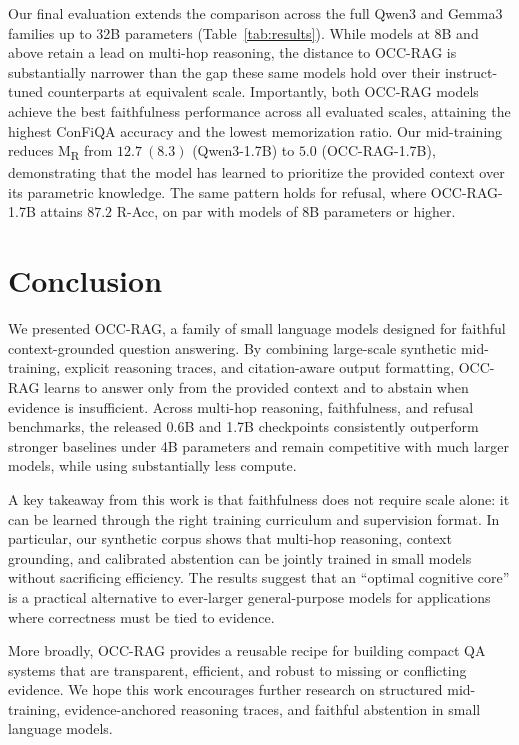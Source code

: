 \documentclass{article}
\begin{document}
Our final evaluation extends the comparison across the full Qwen3 and Gemma3 families up to 32B parameters (Table~\ref{tab:results}). While models at 8B and above retain a lead on multi-hop reasoning, the distance to OCC-RAG is substantially narrower than the gap these same models hold over their instruct-tuned counterparts at equivalent scale. Importantly, both OCC-RAG models achieve the best faithfulness performance across all evaluated scales, attaining the highest ConFiQA accuracy and the lowest memorization ratio. Our mid-training reduces M\textsubscript{R} from $12.7 \ (8.3)$ (Qwen3-1.7B) to $5.0$ (OCC-RAG-1.7B), demonstrating that the model has learned to prioritize the provided context over its parametric knowledge. The same pattern holds for refusal, where OCC-RAG-1.7B attains $87.2$ R-Acc, on par with models of 8B parameters or higher.



\section{Conclusion}
We presented OCC-RAG, a family of small language models designed for faithful context-grounded question answering. By combining large-scale synthetic mid-training, explicit reasoning traces, and citation-aware output formatting, OCC-RAG learns to answer only from the provided context and to abstain when evidence is insufficient. Across multi-hop reasoning, faithfulness, and refusal benchmarks, the released 0.6B and 1.7B checkpoints consistently outperform stronger baselines under 4B parameters and remain competitive with much larger models, while using substantially less compute.

A key takeaway from this work is that faithfulness does not require scale alone: it can be learned through the right training curriculum and supervision format. In particular, our synthetic corpus shows that multi-hop reasoning, context grounding, and calibrated abstention can be jointly trained in small models without sacrificing efficiency. The results suggest that an ``optimal cognitive core'' is a practical alternative to ever-larger general-purpose models for applications where correctness must be tied to evidence.

More broadly, OCC-RAG provides a reusable recipe for building compact QA systems that are transparent, efficient, and robust to missing or conflicting evidence. We hope this work encourages further research on structured mid-training, evidence-anchored reasoning traces, and faithful abstention in small language models.
\end{document}
